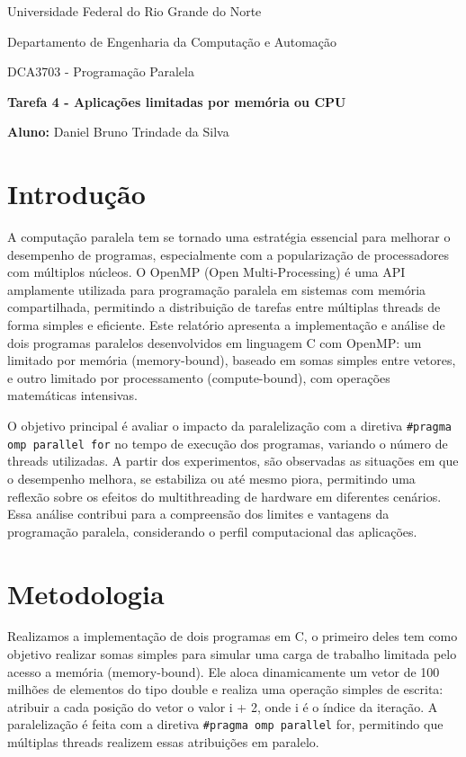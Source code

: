 \documentclass[a4paper, 12pt]{article}
\begin{document}
	\begin{center}
		Universidade Federal do Rio Grande do Norte
		
		Departamento de Engenharia da Computação e Automação
		
		DCA3703 - Programação Paralela
		
		\textbf{Tarefa 4 - Aplicações limitadas por memória ou CPU}
		
		\textbf{Aluno:} Daniel Bruno Trindade da Silva
	\end{center}
	
	\section{Introdução}
	
	\hspace{.7cm}A computação paralela tem se tornado uma estratégia essencial para melhorar o desempenho de programas, especialmente com a popularização de processadores com múltiplos núcleos. O OpenMP (Open Multi-Processing) é uma API amplamente utilizada para programação paralela em sistemas com memória compartilhada, permitindo a distribuição de tarefas entre múltiplas threads de forma simples e eficiente. Este relatório apresenta a implementação e análise de dois programas paralelos desenvolvidos em linguagem C com OpenMP: um limitado por memória (memory-bound), baseado em somas simples entre vetores, e outro limitado por processamento (compute-bound), com operações matemáticas intensivas.
	
	O objetivo principal é avaliar o impacto da paralelização com a diretiva \texttt{\#pragma omp parallel for} no tempo de execução dos programas, variando o número de threads utilizadas. A partir dos experimentos, são observadas as situações em que o desempenho melhora, se estabiliza ou até mesmo piora, permitindo uma reflexão sobre os efeitos do multithreading de hardware em diferentes cenários. Essa análise contribui para a compreensão dos limites e vantagens da programação paralela, considerando o perfil computacional das aplicações.
	
	\section{Metodologia}
	
	\hspace{.7cm}Realizamos a implementação de dois programas em C, o primeiro deles tem como objetivo realizar somas simples para simular uma carga de trabalho limitada pelo acesso a memória (memory-bound). Ele aloca dinamicamente um vetor de 100 milhões de elementos do tipo double e realiza uma operação simples de escrita: atribuir a cada posição do vetor o valor i + 2, onde i é o índice da iteração. A paralelização é feita com a diretiva \texttt{\#pragma omp parallel} for, permitindo que múltiplas threads realizem essas atribuições em paralelo.
	
\end{document}
